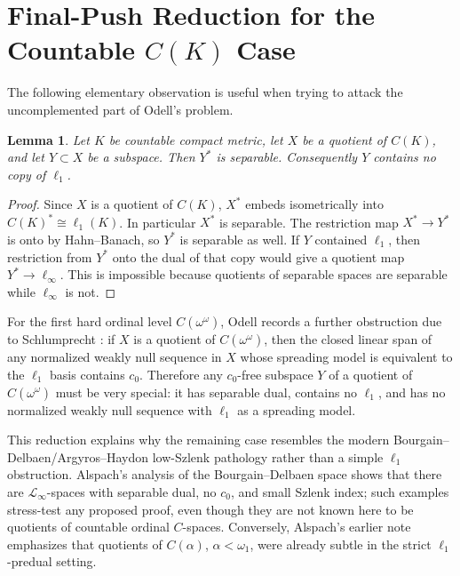 \documentclass[11pt]{article}
\newtheorem*{lemma}{Lemma}
\begin{document}
\section*{Final-Push Reduction for the Countable \(C(K)\) Case}

The following elementary observation is useful when trying to attack the uncomplemented part of Odell's problem.

\begin{lemma}
Let \(K\) be countable compact metric, let \(X\) be a quotient of \(C(K)\), and let \(Y\subset X\) be a subspace.  Then \(Y^*\) is separable.  Consequently \(Y\) contains no copy of \(\ell_1\).
\end{lemma}

\begin{proof}
Since \(X\) is a quotient of \(C(K)\), \(X^*\) embeds isometrically into \(C(K)^*\cong \ell_1(K)\).  In particular \(X^*\) is separable.  The restriction map \(X^*\to Y^*\) is onto by Hahn--Banach, so \(Y^*\) is separable as well.  If \(Y\) contained \(\ell_1\), then restriction from \(Y^*\) onto the dual of that copy would give a quotient map \(Y^*\to \ell_\infty\).  This is impossible because quotients of separable spaces are separable while \(\ell_\infty\) is not.
\end{proof}

For the first hard ordinal level \(C(\omega^\omega)\), Odell records a further obstruction due to Schlumprecht \cite{Odell}: if \(X\) is a quotient of \(C(\omega^\omega)\), then the closed linear span of any normalized weakly null sequence in \(X\) whose spreading model is equivalent to the \(\ell_1\) basis contains \(c_0\).  Therefore any \(c_0\)-free subspace \(Y\) of a quotient of \(C(\omega^\omega)\) must be very special: it has separable dual, contains no \(\ell_1\), and has no normalized weakly null sequence with \(\ell_1\) as a spreading model.

This reduction explains why the remaining case resembles the modern Bourgain--Delbaen/Argyros--Haydon low-Szlenk pathology rather than a simple \(\ell_1\) obstruction.  Alspach's analysis of the Bourgain--Delbaen space \cite{AlspachBD} shows that there are \(\mathscr L_\infty\)-spaces with separable dual, no \(c_0\), and small Szlenk index; such examples stress-test any proposed proof, even though they are not known here to be quotients of countable ordinal \(C\)-spaces.  Conversely, Alspach's earlier note \cite{AlspachPredual} emphasizes that quotients of \(C(\alpha)\), \(\alpha<\omega_1\), were already subtle in the strict \(\ell_1\)-predual setting.
\end{document}
